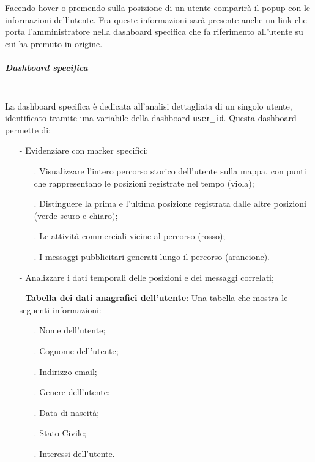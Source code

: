 \documentclass[10pt]{article}
\newcommand{\mysubparagraph}[1]{\subparagraph{#1}\mbox{}\\}
\begin{document}
        Facendo hover o premendo sulla posizione di un utente comparirà il popup con le informazioni dell'utente.
        Fra queste informazioni sarà presente anche un link che porta l'amministratore nella dashboard specifica che fa riferimento all'utente su cui ha premuto in origine.\\

        \mysubparagraph{Dashboard specifica}
        La dashboard specifica è dedicata all'analisi dettagliata di un singolo utente, identificato tramite una variabile della dashboard \texttt{user\_id}. Questa dashboard permette di:

        \begin{itemize}
            \item[-] Evidenziare con marker specifici:
            \begin{itemize}
                \item[.] Visualizzare l'intero percorso storico dell'utente sulla mappa, con punti che rappresentano le posizioni registrate nel tempo (viola);
                \item[.] Distinguere la prima e l'ultima posizione registrata dalle altre posizioni (verde scuro e chiaro);
                \item[.] Le attività commerciali vicine al percorso (rosso);
                \item[.] I messaggi pubblicitari generati lungo il percorso (arancione).
            \end{itemize}
            \item[-] Analizzare i dati temporali delle posizioni e dei messaggi correlati;
            
            \item[-] \textbf{Tabella dei dati anagrafici dell'utente}: Una tabella che mostra le seguenti informazioni:
            \begin{itemize}
                \item[.] Nome dell'utente;
                \item[.] Cognome dell'utente;
                \item[.] Indirizzo email;
                \item[.] Genere dell'utente;
                \item[.] Data di nascità;
                \item[.] Stato Civile;
                \item[.] Interessi dell'utente.
            \end{itemize}
        \end{itemize}
\end{document}
